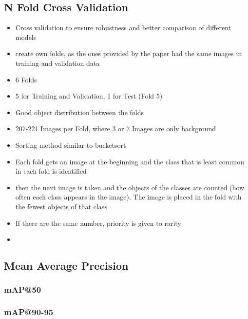 \subsection{N Fold Cross Validation}
\begin{itemize}
    \item Cross validation to ensure robustness and better comparison of different models
    \item create own folds, as the ones provided by the paper had the same images in training and validation data
    \item  6 Folds
    \item 5 for Training and Validation, 1 for Test (Fold 5)
    \item Good object distribution between the folds
    \item 207-221 Images per Fold, where 3 or 7 Images are only background
    
    \item Sorting method similar to bucketsort
    \item Each fold gets an image at the beginning and the class that is least common in each fold is identified
    \item then the next image is taken and the objects of the classes are counted (how often each class appears in the image). The image is placed in the fold with the fewest objects of that class
    \item If there are the same number, priority is given to rarity
    \item {}


\end{itemize}

\subsection{Mean Average Precision}
\subsubsection{mAP@50}
\subsubsection{mAP@90-95}




